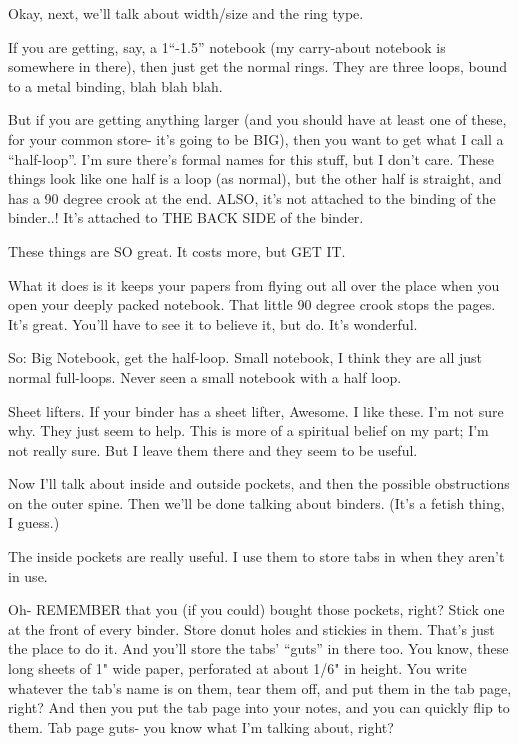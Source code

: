\documentclass[oneside]{book}
\begin{document}
Okay, next, we'll talk about width/size and the ring type.

If you are getting, say, a 1``-1.5'' notebook (my carry-about notebook is
somewhere in there), then just get the normal rings. They are three
loops, bound to a metal binding, blah blah blah.

But if you are getting anything larger (and you should have at least
one of these, for your common store- it's going to be BIG), then you
want to get what I call a ``half-loop''. I'm sure there's formal names
for this stuff, but I don't care. These things look like one half is a
loop (as normal), but the other half is straight, and has a 90 degree
crook at the end. ALSO, it's not attached to the binding of the
binder..! It's attached to THE BACK SIDE of the binder.

These things are SO great. It costs more, but GET IT.


What it does is it keeps your papers from flying out all over the
place when you open your deeply packed notebook. That little 90 degree
crook stops the pages. It's great. You'll have to see it to believe
it, but do. It's wonderful.

So: Big Notebook, get the half-loop. Small notebook, I think they are
all just normal full-loops. Never seen a small notebook with a half
loop.

Sheet lifters. If your binder has a sheet lifter, Awesome. I like
these. I'm not sure why. They just seem to help. This is more of a
spiritual belief on my part; I'm not really sure. But I leave them
there and they seem to be useful.

Now I'll talk about inside and outside pockets, and then the possible
obstructions on the outer spine. Then we'll be done talking about
binders. (It's a fetish thing, I guess.)

The inside pockets are really useful. I use them to store tabs in when
they aren't in use.

Oh- REMEMBER that you (if you could) bought those pockets, right?
Stick one at the front of every binder. Store donut holes and stickies
in them. That's just the place to do it. And you'll store the tabs'
``guts'' in there too. You know, these long sheets of 1" wide paper,
perforated at about 1/6" in height. You write whatever the tab's name
is on them, tear them off, and put them in the tab page, right? And
then you put the tab page into your notes, and you can quickly flip to
them. Tab page guts- you know what I'm talking about, right?
\end{document}
